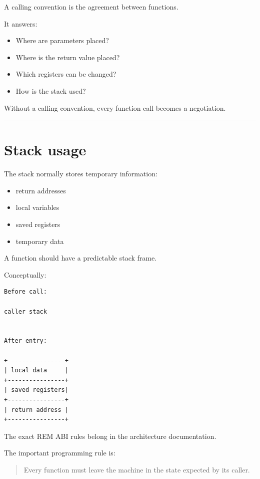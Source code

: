 \documentclass[
  oneside,
  openany]{book}
\providecommand{\tightlist}{%
  \setlength{\itemsep}{0pt}\setlength{\parskip}{0pt}}
\begin{document}
A calling convention is the agreement between functions.

It answers:

\begin{itemize}
\tightlist
\item
  Where are parameters placed?
\item
  Where is the return value placed?
\item
  Which registers can be changed?
\item
  How is the stack used?
\end{itemize}

Without a calling convention, every function call becomes a negotiation.

\begin{center}\rule{0.5\linewidth}{0.5pt}\end{center}

\hypertarget{stack-usage}{%
\section{Stack usage}\label{stack-usage}}

The stack normally stores temporary information:

\begin{itemize}
\tightlist
\item
  return addresses
\item
  local variables
\item
  saved registers
\item
  temporary data
\end{itemize}

A function should have a predictable stack frame.

Conceptually:

\begin{verbatim}
Before call:

caller stack


After entry:

+----------------+
| local data     |
+----------------+
| saved registers|
+----------------+
| return address |
+----------------+
\end{verbatim}

The exact REM ABI rules belong in the architecture documentation.

The important programming rule is:

\begin{quote}
Every function must leave the machine in the state expected by its
caller.
\end{quote}
\end{document}
